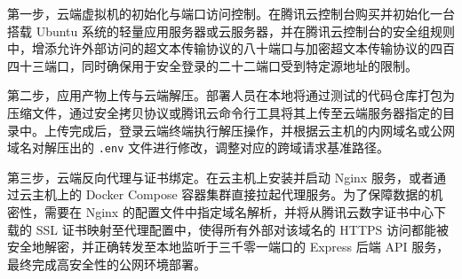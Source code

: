 第一步，云端虚拟机的初始化与端口访问控制。在腾讯云控制台购买并初始化一台搭载 Ubuntu 系统的轻量应用服务器或云服务器，并在腾讯云控制台的安全组规则中，增添允许外部访问的超文本传输协议的八十端口与加密超文本传输协议的四百四十三端口，同时确保用于安全登录的二十二端口受到特定源地址的限制。

第二步，应用产物上传与云端解压。部署人员在本地将通过测试的代码仓库打包为压缩文件，通过安全拷贝协议或腾讯云命令行工具将其上传至云端服务器指定的目录中。上传完成后，登录云端终端执行解压操作，并根据云主机的内网域名或公网域名对解压出的 \texttt{.env} 文件进行修改，调整对应的跨域请求基准路径。

第三步，云端反向代理与证书绑定。在云主机上安装并启动 Nginx 服务，或者通过云主机上的 Docker Compose 容器集群直接拉起代理服务。为了保障数据的机密性，需要在 Nginx 的配置文件中指定域名解析，并将从腾讯云数字证书中心下载的 SSL 证书映射至代理配置中，使得所有外部对该域名的 HTTPS 访问都能被安全地解密，并正确转发至本地监听于三千零一端口的 Express 后端 API 服务，最终完成高安全性的公网环境部署。
